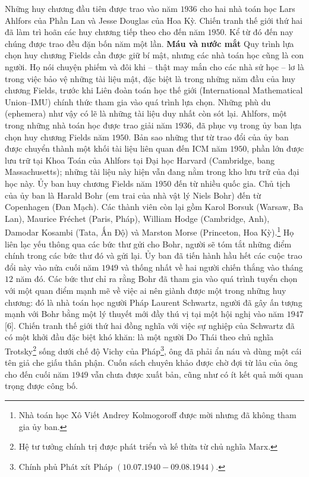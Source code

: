 \begin{multicols}{2}
	\vskip 0.1cm
	Những huy chương đầu tiên được trao vào năm $1936$ cho hai nhà toán học Lars Ahlfors của Phần Lan và Jesse Douglas của Hoa Kỳ. Chiến tranh thế giới thứ hai đã làm trì hoãn các huy chương tiếp theo cho đến năm $1950$. Kể từ đó đến nay chúng được trao đều đặn bốn năm một lần.
	\vskip 0.1cm
	\textbf{\color{lichsutoanhoc}Máu và nước mắt}
	\vskip 0.1cm
	Quy trình lựa chọn huy chương Fields cần được giữ bí mật, nhưng các nhà toán học cũng là con người. Họ nói chuyện phiếm và đôi khi -- thật may mắn cho các nhà sử học -- lơ là trong việc bảo vệ những tài liệu mật, đặc biệt là trong những năm đầu của huy chương Fields, trước khi Liên đoàn toán học thế giới (International Mathematical Union--IMU) chính thức tham gia vào quá trình lựa chọn. Những phù du (ephemera) như vậy có lẽ là những tài liệu duy nhất còn sót lại.
	\vskip 0.1cm
	Ahlfors, một trong những nhà toán học được trao giải năm $1936$, đã phục vụ trong ủy ban lựa chọn huy chương Fields năm $1950$. Bản sao những thư từ trao đổi của ủy ban được chuyển thành một khối tài liệu liên quan đến ICM năm $1950$, phần lớn được lưu trữ tại Khoa Toán của Ahlfors tại Đại học Harvard (Cambridge, bang Massachusetts); những tài liệu này hiện vẫn đang nằm trong kho lưu trữ của đại học này.
	\vskip 0.1cm
	Ủy ban huy chương Fields năm $1950$ đến từ nhiều quốc gia. Chủ tịch của ủy ban là Harald Bohr (em trai của nhà vật lý Niels Bohr) đến từ Copenhagen (Đan Mạch). Các thành viên còn lại gồm Karol Borsuk (Warsaw, Ba Lan), Maurice Fréchet (Paris, Pháp), William Hodge (Cambridge, Anh), Damodar Kosambi (Tata, Ấn Độ) và Marston Morse (Princeton, Hoa Kỳ).\footnote[6]{\color{lichsutoanhoc}Nhà toán học Xô Viết Andrey Kolmogoroff được mời nhưng đã không tham gia ủy ban.}
	Họ liên lạc yếu thông qua các bức thư gửi cho Bohr, người sẽ tóm tắt những điểm chính trong các bức thư đó và gửi lại. Ủy ban đã tiến hành hầu hết các cuộc trao đổi này vào nửa cuối năm $1949$ và thống nhất về hai người chiến thắng vào tháng $12$ năm đó. 
	\vskip 0.1cm
	Các bức thư chỉ ra rằng Bohr đã tham gia vào quá trình tuyển chọn với một quan điểm mạnh mẽ về việc ai nên giành được một trong những huy chương: đó là nhà toán học người Pháp Laurent Schwartz, người đã gây ấn tượng mạnh với Bohr bằng một lý thuyết mới đầy thú vị tại một hội nghị vào năm $1947$ [$6$]. Chiến tranh thế giới thứ hai đồng nghĩa với việc sự nghiệp của Schwartz đã có một khởi đầu đặc biệt khó khăn: là một người Do Thái theo chủ nghĩa Trotsky\footnote[7]{\color{lichsutoanhoc}Hệ tư tưởng chính trị được phát triển và kế thừa từ chủ nghĩa Marx.} sống dưới chế độ Vichy của Pháp\footnote[8]{\color{lichsutoanhoc}Chính phủ Phát xít Pháp $(10.07.1940 - 09.08.1944)$.}, ông đã phải ẩn náu và dùng một cái tên giả che giấu thân phận. Cuốn sách chuyên khảo được chờ đợi từ lâu của ông cho đến cuối năm $1949$ vẫn chưa được xuất bản, cũng như có ít kết quả mới quan trọng được công bố.

\end{multicols}
